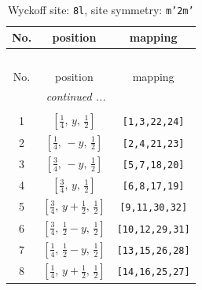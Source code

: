 \documentclass[fleqn,8pt]{jsarticle}
\begin{document}
\begin{longtable}{ccc}
\caption{Wyckoff site: {\tt 8l}, site symmetry: {\tt m'2m'}}
 \\
 \hline \hline
No. & position & mapping \\ \hline \endfirsthead

\multicolumn{2}{l}{\tablename\ \thetable{}} \\
 \hline \hline
No. & position & mapping \\ \hline \endhead

 \hline \hline
\multicolumn{2}{r}{\footnotesize\it continued ...} \\ \endfoot

 \hline \hline
\multicolumn{2}{r}{} \\ \endlastfoot

1 & $\left[ \frac{1}{4},\, y,\, \frac{1}{2} \right]$ & {\tt [1,3,22,24]} \\ \hline
2 & $\left[ \frac{1}{4},\, - y,\, \frac{1}{2} \right]$ & {\tt [2,4,21,23]} \\ \hline
3 & $\left[ \frac{3}{4},\, - y,\, \frac{1}{2} \right]$ & {\tt [5,7,18,20]} \\ \hline
4 & $\left[ \frac{3}{4},\, y,\, \frac{1}{2} \right]$ & {\tt [6,8,17,19]} \\ \hline
5 & $\left[ \frac{3}{4},\, y + \frac{1}{2},\, \frac{1}{2} \right]$ & {\tt [9,11,30,32]} \\ \hline
6 & $\left[ \frac{3}{4},\, \frac{1}{2} - y,\, \frac{1}{2} \right]$ & {\tt [10,12,29,31]} \\ \hline
7 & $\left[ \frac{1}{4},\, \frac{1}{2} - y,\, \frac{1}{2} \right]$ & {\tt [13,15,26,28]} \\ \hline
8 & $\left[ \frac{1}{4},\, y + \frac{1}{2},\, \frac{1}{2} \right]$ & {\tt [14,16,25,27]} \\
\end{longtable}
\renewcommand{\arraystretch}{1.2}
\end{document}
